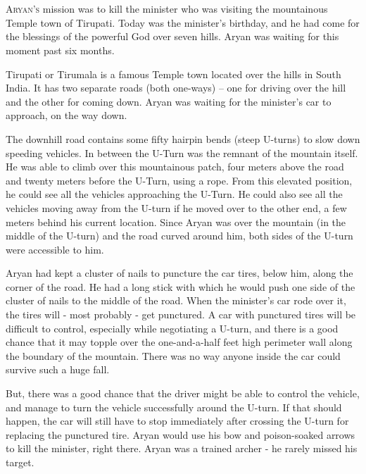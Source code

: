 
\chapter{}

\lettrine{A}{ryan's} mission was to kill the minister who was visiting the mountainous Temple
town of Tirupati. Today was the minister's birthday, and he had come for the
blessings of the powerful God over seven hills. Aryan was waiting for this
moment past six months.

Tirupati or Tirumala is a famous Temple town located over the hills in South
India. It has two separate roads (both one-ways) – one for driving over the hill
and the other for coming down. Aryan was waiting for the minister's car to
approach, on the way down.

The downhill road contains some fifty hairpin bends (steep U-turns) to slow down
speeding vehicles. In between the U-Turn was the remnant of the mountain itself.
He was able to climb over this mountainous patch, four meters above the road and
twenty meters before the U-Turn, using a rope. From this elevated position, he
could see all the vehicles approaching the U-Turn. He could also see all the
vehicles moving away from the U-turn if he moved over to the other end, a few
meters behind his current location. Since Aryan was over the mountain (in the
middle of the U-turn) and the road curved around him, both sides of the U-turn
were accessible to him.

Aryan had kept a cluster of nails to puncture the car tires, below him, along
the corner of the road. He had a long stick with which he would push one side of
the cluster of nails to the middle of the road. When the minister's car rode
over it, the tires will - most probably - get punctured. A car with punctured
tires will be difficult to control, especially while negotiating a U-turn, and
there is a good chance that it may topple over the one-and-a-half feet high
perimeter wall along the boundary of the mountain. There was no way anyone
inside the car could survive such a huge fall.

But, there was a good chance that the driver might be able to control the
vehicle, and manage to turn the vehicle successfully around the U-turn. If that
should happen, the car will still have to stop immediately after crossing the
U-turn for replacing the punctured tire. Aryan would use his bow and
poison-soaked arrows to kill the minister, right there. Aryan was a trained
archer - he rarely missed his target.

